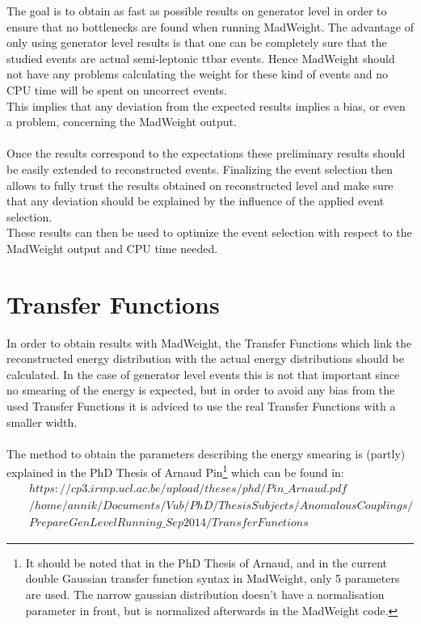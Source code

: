 
The goal is to obtain as fast as possible results on generator level in order to ensure that no bottlenecks are found when running MadWeight.
The advantage of only using generator level results is that one can be completely sure that the studied events are actual semi-leptonic ttbar events. Hence MadWeight should not have any problems calculating the weight for these kind of events and no CPU time will be spent on uncorrect events.\\
This implies that any deviation from the expected results implies a bias, or even a problem, concerning the MadWeight output.\\
\\
Once the results correspond to the expectations these preliminary results should be easily extended to reconstructed events. Finalizing the event selection then allows to fully trust the results obtained on reconstructed level and make sure that any deviation should be explained by the influence of the applied event selection.\\
These results can then be used to optimize the event selection with respect to the MadWeight output and CPU time needed.

\section{Transfer Functions}
In order to obtain results with MadWeight, the Transfer Functions which link the reconstructed energy distribution with the actual energy distributions should be calculated. In the case of generator level events this is not that important since no smearing of the energy is expected, but in order to avoid any bias from the used Transfer Functions it is adviced to use the real Transfer Functions with a smaller width.\\
\\
The method to obtain the parameters describing the energy smearing is (partly) explained in the PhD Thesis of Arnaud Pin\footnote{It should be noted that in the PhD Thesis of Arnaud, and in the current double Gaussian transfer function syntax in MadWeight, only 5 parameters are used. The narrow gaussian distribution doesn't have a normalisation parameter in front, but is normalized afterwards in the MadWeight code.} which can be found in:
\begin{eqnarray*}
 & & https://cp3.irmp.ucl.ac.be/upload/theses/phd/Pin\_Arnaud.pdf \\
& & /home/annik/Documents/Vub/PhD/ThesisSubjects/AnomalousCouplings/\\ & & PrepareGenLevelRunning\_Sep2014/TransferFunctions
\end{eqnarray*}

